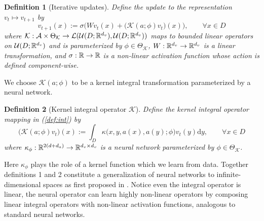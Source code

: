 \documentclass{article} %
\newcommand{\A}{\mathcal{A}}
\newcommand{\U}{\mathcal{U}}
\newcommand{\cK}{\mathcal{K}}
\newtheorem{definition}{Definition}
\begin{document}
\begin{definition}[Iterative updates]
Define the update to the representation $v_t \mapsto v_{t+1}$ by
\begin{equation}\label{def:int}
v_{t+1}(x) := \sigma\Big( W v_t(x) 
+ \bigl(\cK(a;\phi)v_t\bigr)(x) \Big), \qquad \forall x \in D
\end{equation}
where $\cK: \A \times \Theta_{\cK} \to \mathcal{L}(\U(D; \R^{d_v}),\U(D; \R^{d_v}))$ maps to bounded linear operators on $\U(D; \R^{d_v})$ and is parameterized by $\phi \in \Theta_{\cK}$, $W: \mathbb{R}^{d_v} \to \mathbb{R}^{d_v}$ is a linear transformation, and $\sigma : \mathbb{R} \to \mathbb{R}$ is a non-linear activation function whose action is defined component-wise. 
\end{definition}
We choose $\cK(a;\phi)$ to be a kernel integral transformation parameterized by a neural network.
\begin{definition}[Kernel integral operator $\cK$] 
Define the kernel integral operator mapping in (\ref{def:int}) by
\begin{equation}
\label{def:K_int}
\bigl(\cK(a;\phi)v_t\bigr)(x) :=  
\int_{D} \kappa\big(x,y,a(x),a(y);\phi\big) v_t(y) \mathrm{d}y, \qquad \forall x \in D
\end{equation}
where $\kappa_{\phi}: \mathbb{R}^{2(d+d_a)} \to \mathbb{R}^{d_v \times d_v}$ is a neural network parameterized by $\phi \in \Theta_{\cK}$.
\end{definition}
Here $\kappa_\phi$ plays the role of a kernel function which we learn from data. Together definitions 1 and 2 constitute a generalization of neural networks to infinite-dimensional spaces as first proposed in \cite{li2020neural}. Notice even the integral operator is linear, the neural operator can learn highly non-linear operators by composing linear integral operators with non-linear activation functions, analogous to standard neural networks.
\end{document}
